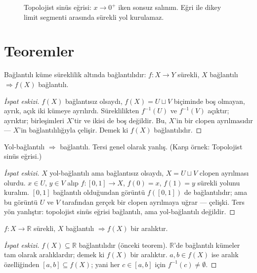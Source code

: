 \begin{figure}[ht]
  \centering
  
  \caption{Topolojist sinüs eğrisi: $x\to 0^+$ iken sonsuz salınım. Eğri ile
    dikey limit segmenti arasında sürekli yol kurulamaz.}
\end{figure}

\section{Teoremler}

\begin{theorem}
Bağlantılı küme süreklilik altında bağlantılıdır:
$f: X \to Y$ sürekli, $X$ bağlantılı $\Rightarrow f(X)$ bağlantılı.
\end{theorem}

\begin{proof}[İspat eskizi]
$f(X)$ bağlantısız olsaydı, $f(X) = U \sqcup V$ biçiminde boş olmayan, ayrık, açık
iki kümeye ayrılırdı. Süreklilikten $f^{-1}(U)$ ve $f^{-1}(V)$ açıktır; ayrıktır;
birleşimleri $X$'tir ve ikisi de boş değildir. Bu, $X$'in bir clopen ayrılmasıdır
--- $X$'in bağlantılılığıyla çelişir. Demek ki $f(X)$ bağlantılıdır.
\end{proof}

\begin{theorem}
Yol-bağlantılı $\Rightarrow$ bağlantılı. Tersi genel olarak yanlış.
(Karşı örnek: Topolojist sinüs eğrisi.)
\end{theorem}

\begin{proof}[İspat eskizi]
$X$ yol-bağlantılı ama bağlantısız olsaydı, $X = U \sqcup V$ clopen ayrılması
olurdu. $x \in U$, $y \in V$ alıp $f:[0,1]\to X$, $f(0)=x$, $f(1)=y$ sürekli
yolunu kuralım. $[0,1]$ bağlantılı olduğundan görüntü $f([0,1])$ de bağlantılıdır;
ama bu görüntü $U$ ve $V$ tarafından gerçek bir clopen ayrılmaya uğrar --- çelişki.
Ters yön yanlıştır: topolojist sinüs eğrisi bağlantılı, ama yol-bağlantılı değildir.
\end{proof}

\begin{theorem}
$f: X \to \mathbb{R}$ sürekli, $X$ bağlantılı $\Rightarrow f(X)$ bir aralıktır.
\end{theorem}

\begin{proof}[İspat eskizi]
$f(X) \subseteq \mathbb{R}$ bağlantılıdır (önceki teorem). $\mathbb{R}$'de
bağlantılı kümeler tam olarak aralıklardır; demek ki $f(X)$ bir aralıktır.
$a, b \in f(X)$ ise aralık özelliğinden $[a,b] \subseteq f(X)$; yani her
$c \in [a,b]$ için $f^{-1}(c) \neq \emptyset$.
\end{proof}

